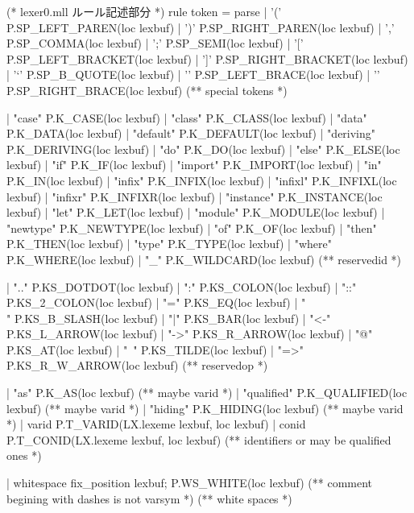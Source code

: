 \documentclass[mingoth,a4paper]{jsarticle}
\begin{document}
\begin{commandline}
(* lexer0.mll ルール記述部分 *)
rule token = parse
  | '('  { P.SP_LEFT_PAREN(loc lexbuf) }
  | ')'  { P.SP_RIGHT_PAREN(loc lexbuf) }
  | ','  { P.SP_COMMA(loc lexbuf) }
  | ';'  { P.SP_SEMI(loc lexbuf) }
  | '['  { P.SP_LEFT_BRACKET(loc lexbuf) }
  | ']'  { P.SP_RIGHT_BRACKET(loc lexbuf) }
  | '`'  { P.SP_B_QUOTE(loc lexbuf) }
  | '{'  { P.SP_LEFT_BRACE(loc lexbuf) }
  | '}'  { P.SP_RIGHT_BRACE(loc lexbuf) }
      (** special tokens *)

  | "case"     { P.K_CASE(loc lexbuf) }
  | "class"    { P.K_CLASS(loc lexbuf) }
  | "data"     { P.K_DATA(loc lexbuf) }
  | "default"  { P.K_DEFAULT(loc lexbuf) }
  | "deriving" { P.K_DERIVING(loc lexbuf) }
  | "do"       { P.K_DO(loc lexbuf) }
  | "else"     { P.K_ELSE(loc lexbuf) }
  | "if"       { P.K_IF(loc lexbuf) }
  | "import"   { P.K_IMPORT(loc lexbuf) }
  | "in"       { P.K_IN(loc lexbuf) }
  | "infix"    { P.K_INFIX(loc lexbuf) }
  | "infixl"   { P.K_INFIXL(loc lexbuf) }
  | "infixr"   { P.K_INFIXR(loc lexbuf) }
  | "instance" { P.K_INSTANCE(loc lexbuf) }
  | "let"      { P.K_LET(loc lexbuf) }
  | "module"   { P.K_MODULE(loc lexbuf) }
  | "newtype"  { P.K_NEWTYPE(loc lexbuf) }
  | "of"       { P.K_OF(loc lexbuf) }
  | "then"     { P.K_THEN(loc lexbuf) }
  | "type"     { P.K_TYPE(loc lexbuf) }
  | "where"    { P.K_WHERE(loc lexbuf) }
  | "_"        { P.K_WILDCARD(loc lexbuf) }
      (** reservedid *)

  | ".."       { P.KS_DOTDOT(loc lexbuf) }
  | ":"        { P.KS_COLON(loc lexbuf) }
  | "::"       { P.KS_2_COLON(loc lexbuf) }
  | "="        { P.KS_EQ(loc lexbuf) }
  | "\\"       { P.KS_B_SLASH(loc lexbuf) }
  | "|"        { P.KS_BAR(loc lexbuf) }
  | "<-"       { P.KS_L_ARROW(loc lexbuf) }
  | "->"       { P.KS_R_ARROW(loc lexbuf) }
  | "@"        { P.KS_AT(loc lexbuf) }
  | "~"        { P.KS_TILDE(loc lexbuf) }
  | "=>"       { P.KS_R_W_ARROW(loc lexbuf) }
      (** reservedop *)

  | "as"              { P.K_AS(loc lexbuf) }  (** maybe varid *)
  | "qualified"       { P.K_QUALIFIED(loc lexbuf) }  (** maybe varid *)
  | "hiding"          { P.K_HIDING(loc lexbuf) }  (** maybe varid *)
  | varid      { P.T_VARID(LX.lexeme lexbuf, loc lexbuf) }
  | conid      { P.T_CONID(LX.lexeme lexbuf, loc lexbuf) }
      (** identifiers or may be qualified ones *)

  | whitespace  { fix_position lexbuf; P.WS_WHITE(loc lexbuf) }  (** comment begining with dashes is not varsym *)
      (** white spaces *)


\end{commandline}
\end{document}
